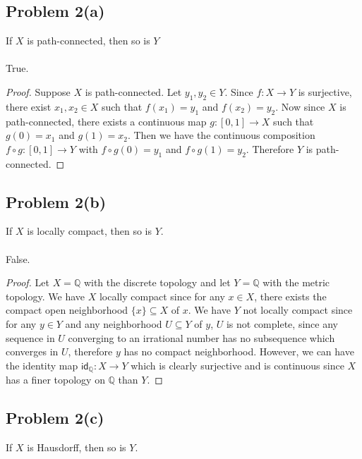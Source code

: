 \documentclass[12pt]{article}
\newenvironment{problem}
    {\begin{lrbox}{\mybox}\begin{minipage}{\textwidth-10pt}}
    {\end{minipage}\end{lrbox}\framebox[6.5in]{\usebox{\mybox}}}
\newenvironment{response}{\paragraph{}}{}
\newcommand{\Q}{\mathbb{Q}}
\newcommand{\id}[1]{\mathsf{id}_{#1}}
\begin{document}
\subsection*{Problem 2(a)}
\begin{problem}
    If $X$ is path-connected, then so is $Y$
\end{problem}

\begin{response}
    True.
\end{response}

\begin{proof}
    Suppose $X$ is path-connected. Let $y_1,y_2\in Y$. Since $f:X\to Y$ is surjective, there exist $x_1,x_2\in X$ such that $f(x_1)=y_1$ and $f(x_2)=y_2$. Now since $X$ is path-connected, there exists a continuous map $g:[0,1]\to X$ such that $g(0)=x_1$ and $g(1)=x_2$. Then we have the continuous composition $f\circ g :[0,1] \to Y$ with $f\circ g(0) = y_1$ and $f\circ g(1)=y_2$. Therefore $Y$ is path-connected.
    
\end{proof} 

\subsection*{Problem 2(b)}
\begin{problem}
    If $X$ is locally compact, then so is $Y$.
\end{problem}

\begin{response}
    False.
\end{response}

\begin{proof}
    Let $X=\Q$ with the discrete topology and let $Y=\Q$ with the metric topology. We have $X$ locally compact since for any $x\in X$, there exists the compact open neighborhood $\{x\}\subseteq X$ of $x$. We have $Y$ not locally compact since for any $y\in Y$ and any neighborhood $U\subseteq Y$ of $y$, $U$ is not complete, since any sequence in $U$ converging to an irrational number has no subsequence which converges in $U$, therefore $y$ has no compact neighborhood. However, we can have the identity map $\id{\Q}:X\to Y$ which is clearly surjective and is continuous since $X$ has a finer topology on $\Q$ than $Y$.
    
\end{proof}

\subsection*{Problem 2(c)}
\begin{problem}
    If $X$ is Hausdorff, then so is $Y$.
\end{problem}
\end{document}
